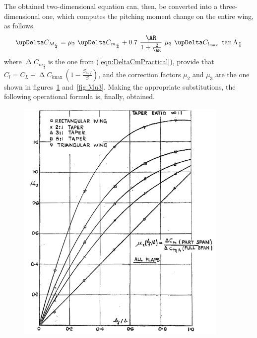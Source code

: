 \bigskip
\noindent
The obtained two-dimensional equation can, then, be converted into a three-dimensional one, which computes the pitching moment change on the entire wing, as follows.
%
\begin{equation}
\upDelta C_{M_{\frac{c}{4}}}=\mu_2\ \upDelta C_{m_{\frac{c}{4}}}+0.7\ \dfrac{\AR}{1+\frac{2}{\AR}}\ \mu_3\ \upDelta C_{l_{\text{max}}}\ \tan\Lambda_{\frac{c}{4}}
\label{eqn:DeltaCM}
\end{equation}
%
where $\upDelta C_{m_{\frac{c}{4}}}$ is the one from (\ref{eqn:DeltaCmPractical}), provide that $C_l=C_L+\upDelta C_{l\text{max}}\ \left(1-\frac{S_{w,f}}{S}\right)$, and the correction factors $\mu_2$ and $\mu_3$ are the one shown in figures~\ref{fig:Mu2} and~\ref{fig:Mu3}. Making the appropriate substitutions, the following operational formula is, finally, obtained.
%
\begin{figure}[!t]
\centering
\begin{minipage}{.5\textwidth}
\centering
\includegraphics[width=1.1\linewidth]{Mu2_Pitching_Moment}
\label{fig:Mu2}
\end{minipage}%

\end{figure}
